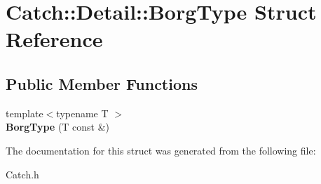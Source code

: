 \hypertarget{struct_catch_1_1_detail_1_1_borg_type}{\section{Catch\-:\-:Detail\-:\-:Borg\-Type Struct Reference}
\label{struct_catch_1_1_detail_1_1_borg_type}
}
\subsection*{Public Member Functions}
\begin{DoxyCompactItemize}
\item 
\hypertarget{struct_catch_1_1_detail_1_1_borg_type_a780a9946ed0d654f0bfc043c8fc505d8}{{\footnotesize template$<$typename T $>$ }\\{\bfseries Borg\-Type} (T const \&)}\label{struct_catch_1_1_detail_1_1_borg_type_a780a9946ed0d654f0bfc043c8fc505d8}

\end{DoxyCompactItemize}


The documentation for this struct was generated from the following file\-:\begin{DoxyCompactItemize}
\item 
Catch.\-h\end{DoxyCompactItemize}

